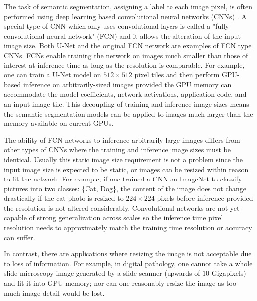 \documentclass[runningheads]{llncs}
\begin{document}
The task of semantic segmentation, assigning a label to each image pixel, is often performed using deep learning based convolutional neural networks (CNNs) \cite{Badrinarayanan2015a,Ronneberger2015a}. A special type of CNN which only uses convolutional layers is called a "fully convolutional neural network" (FCN) and it allows the alteration of the input image size. Both U-Net \cite{Ronneberger2015a} and the original FCN network \cite{Long2015} are examples of FCN type CNNs. 
FCNs enable training the network on images much smaller than those of interest at inference time as long as the resolution is comparable. 
For example, one can train a U-Net model on $512 \times 512$ pixel tiles and then perform GPU-based inference on arbitrarily-sized images provided the GPU memory can accommodate the model coefficients, network activations, application code, and an input image tile. This decoupling of training and inference image sizes means the semantic segmentation models can be applied to images much larger than the memory available on current GPUs. 

The ability of FCN networks to inference arbitrarily large images differs from other types of CNNs where the training and inference image sizes must be identical. Usually this static image size requirement is not a problem since the input image size is expected to be static, or images can be resized within reason to fit the network. For example, if one trained a CNN on ImageNet \cite{Russakovsky2015} to classify pictures into two classes: \{Cat, Dog\}, the content of the image does not change drastically if the cat photo is resized to $224 \times 224$ pixels before inference provided the resolution is not altered considerably. Convolutional networks are not yet capable of strong generalization across scales \cite{Jaderberg2015,Lin2017a} so the inference time pixel resolution needs to approximately match the training time resolution or accuracy can suffer.

In contrast, there are applications where resizing the image is not acceptable due to loss of information. For example, in digital pathology, one cannot take a whole slide microscopy image generated by a slide scanner (upwards of $\num{10}$ Gigapixels) and fit it into GPU memory; nor can one reasonably resize the image as too much image detail would be lost. 
\end{document}
